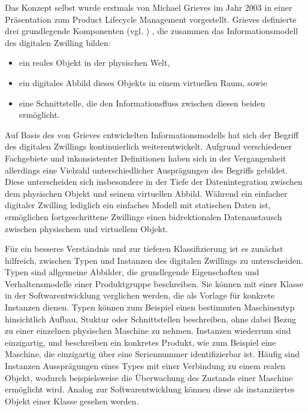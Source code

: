 Das Konzept selbst wurde erstmals von Michael Grieves im Jahr 2003 in einer Präsentation zum Product Lifecycle Management vorgestellt. 
Grieves definierte drei grundlegende Komponenten (vgl. \cite{DTGrieves}) , die zusammen das Informationsmodell des digitalen Zwilling bilden:
\begin{itemize}
    \item ein reales Objekt in der physischen Welt,
    \item ein digitales Abbild dieses Objekts in einem virtuellen Raum, sowie
    \item eine Schnittstelle, die den Informationsfluss zwischen diesen beiden ermöglicht.
\end{itemize}

Auf Basis des von Grieves entwickelten Informationsmodells hat sich der Begriff des digitalen Zwillings kontinuierlich weiterentwickelt.
Aufgrund verschiedener Fachgebiete und inkonsistenter Definitionen haben sich in der Vergangenheit allerdings eine Vielzahl unterschiedlicher Ausprägungen des Begriffs gebildet.
Diese unterscheiden sich insbesondere in der Tiefe der Datenintegration zwischen dem physischen Objekt und seinem virtuellen Abbild.
Während ein einfacher digitaler Zwilling lediglich ein einfaches Modell mit statischen Daten ist, ermöglichen fortgeschrittene Zwillinge einen bidrektionalen Datenaustausch zwischen physischem und virtuellem Objekt. 

Für ein besseres Verständnis und zur tieferen Klassifizierung ist es zunächst hilfreich, zwischen Typen und Instanzen des digitalen Zwillings zu unterscheiden.
Typen sind allgemeine Abbilder, die grundlegende Eigenschaften und Verhaltensmodelle einer Produktgruppe beschreiben. 
Sie können mit einer Klasse in der Softwarentwicklung verglichen werden, die als Vorlage für konkrete Instanzen dienen.
Typen können zum Beispiel einen bestimmten Maschinentyp hinsichtlich Aufbau, Stuktur oder Schnittstellen beschreiben, ohne dabei Bezug zu einer einzelnen physischen Maschine zu nehmen.
Instanzen wiederrum sind einzigartig, und beschreiben ein konkretes Produkt, wie zum Beispiel eine Maschine, die einzigartig über eine Seriennummer identifizierbar ist.
Häufig sind Instanzen Aussprägungen eines Types mit einer Verbindung zu einem realen Objekt, wodurch beispielsweise die Überwachung des Zustands einer Maschine ermöglicht wird.
Analog zur Softwarentwicklung können diese als instanziiertes Objekt einer Klasse gesehen werden. \cite{ZEISS}

